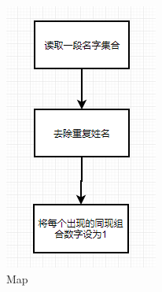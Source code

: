 \documentclass{ctexart}
\begin{document}
		\begin{figure}[H]
		\centering
		\begin{minipage}[t]{0.3\textwidth}
			\centering
			\includegraphics[width=0.9\linewidth]{pic/task2/map}
			\caption{Map}
			\label{fig:map}
		\end{minipage}
		\begin{minipage}[t]{0.6\textwidth}
			\centering

\end{minipage}
\end{figure}
\end{document}
